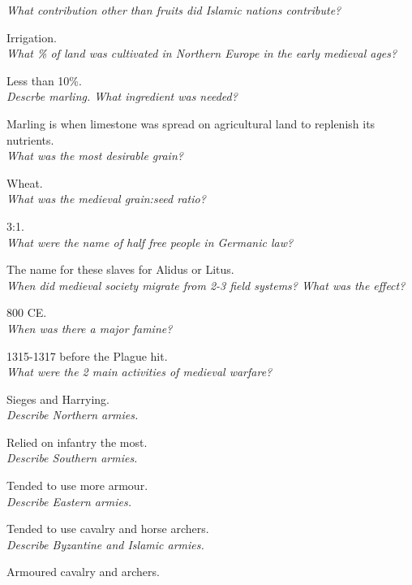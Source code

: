 \documentclass[12pt]{article}
\begin{document}
\textit{What contribution other than fruits did Islamic nations contribute?}

Irrigation.\\

\textit{What \% of land was cultivated in Northern Europe in the early medieval ages?}

Less than 10\%.\\

\textit{Descrbe marling. What ingredient was needed?}

Marling is when limestone was spread on agricultural land to replenish its nutrients.\\


\textit{What was the most desirable grain?}

Wheat.\\

\textit{What was the medieval grain:seed ratio?}

3:1.\\

\textit{What were the name of half free people in Germanic law?}

The name for these slaves for Alidus or Litus.\\

\textit{When did medieval society migrate from 2-3 field systems? What was the effect?}

800 CE.\\

\textit{When was there a major famine?}

1315-1317 before the Plague hit.\\

\textit{What were the 2 main activities of medieval warfare?}

Sieges and Harrying.\\

\textit{Describe Northern armies.}

Relied on infantry the most.\\

\textit{Describe Southern armies.}

Tended to use more armour.\\

\textit{Describe Eastern armies.}

Tended  to use cavalry and horse archers.\\

\textit{Describe Byzantine and Islamic armies.}

Armoured cavalry and archers.\\
\end{document}
